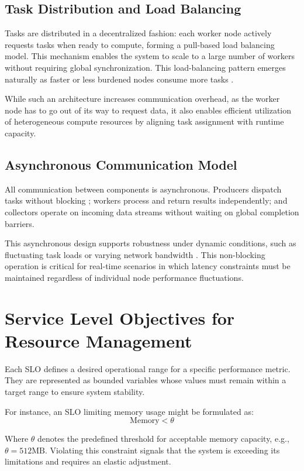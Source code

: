 \subsection{Task Distribution and Load Balancing}
Tasks are distributed in a decentralized fashion: each worker node actively requests tasks when ready to compute, forming a pull-based load balancing model. This mechanism enables the system to scale to a large number of workers without requiring global synchronization. This load-balancing pattern emerges naturally as faster or less burdened nodes consume more tasks \cite{estrada_comparing_2015}.

While such an architecture increases communication overhead, as the worker node has to go out of its way to request data, it also enables efficient utilization of heterogeneous compute resources by aligning task assignment with runtime capacity.

\subsection{Asynchronous Communication Model}
All communication between components is asynchronous. Producers dispatch tasks without blocking \cite{lauener_how_2018}; workers process and return results independently; and collectors operate on incoming data streams without waiting on global completion barriers.

This asynchronous design supports robustness under dynamic conditions, such as fluctuating task loads or varying network bandwidth \cite{nguyen_octopinf_2025}. This non-blocking operation is critical for real-time scenarios in which latency constraints must be maintained regardless of individual node performance fluctuations.


\section{Service Level Objectives for Resource Management}
Each SLO defines a desired operational range for a specific performance metric. They are represented as bounded variables whose values must remain within a target range to ensure system stability.

For instance, an SLO limiting memory usage might be formulated as:
\[
\text{Memory} < \theta
\]

Where \(\theta\) denotes the predefined threshold for acceptable memory capacity, e.g., \(\theta = 512\text{MB}\). Violating this constraint signals that the system is exceeding its limitations and requires an elastic adjustment.

